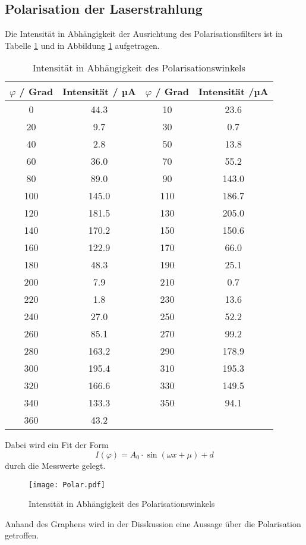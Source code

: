 \subsection{Polarisation der Laserstrahlung}
Die Intensität in Abhängigkeit der Ausrichtung des Polarisationsfilters ist in Tabelle \ref{tab:Pol} und in Abbildung \ref{fig:Pol} aufgetragen.
\begin{table}
  \centering
  \caption{Intensität in Abhängigkeit des Polarisationswinkels}
  \begin{tabular}{c c | c c}
    \toprule
    $\varphi$ / Grad & Intensität / µA & $\varphi$ / Grad & Intensität /µA \\
    \midrule
	0	& 44.3	& 10	& 23.6	\\
	20	& 9.7	& 30	& 0.7	\\
	40	& 2.8	& 50	& 13.8	\\
	60	& 36.0	& 70	& 55.2	\\
	80	& 89.0	& 90	& 143.0	\\
	100	& 145.0	& 110	& 186.7	\\
	120	& 181.5	& 130	& 205.0	\\
	140	& 170.2	& 150	& 150.6	\\
	160	& 122.9	& 170	& 66.0	\\
	180	& 48.3	& 190	& 25.1	\\
	200	& 7.9	& 210	& 0.7	\\
	220	& 1.8	& 230	& 13.6	\\
	240	& 27.0	& 250	& 52.2	\\
	260	& 85.1	& 270	& 99.2	\\
	280	& 163.2	& 290	& 178.9	\\
	300	& 195.4	& 310	& 195.3	\\
	320	& 166.6	& 330	& 149.5	\\
	340	& 133.3 & 350	& 94.1	\\
	360	& 43.2	\\
    \bottomrule
  \end{tabular}
  \label{tab:Pol}
\end{table}
Dabei wird ein Fit der Form
\begin{equation}
  I(\varphi) = A_0 \cdot \sin(\omega x + \mu) + d
  \label{eqn:pfit}
\end{equation}
durch die Messwerte gelegt.
\begin{figure}
  \centering
  \texttt{[image: Polar.pdf]}
  \caption{Intensität in Abhängigkeit des Polarisationswinkels}
  \label{fig:Pol}
\end{figure}
Anhand des Graphens wird in der Disskussion eine Aussage über die Polarisation getroffen.

